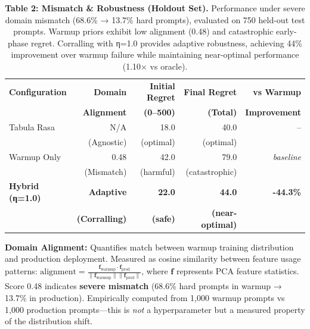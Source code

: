 
\begin{table}[t]
\caption{\textbf{Table 2: Mismatch \& Robustness (Holdout Set).} Performance under severe domain mismatch (68.6\% → 13.7\% hard prompts), evaluated on 750 held-out test prompts. Warmup priors exhibit low alignment (0.48) and catastrophic early-phase regret. Corralling with η=1.0 provides adaptive robustness, achieving 44\% improvement over warmup failure while maintaining near-optimal performance (1.10× vs oracle).}
\label{tab:mismatch-robustness}
\centering
\small
\begin{tabular}{@{}lrrrr@{}}
\toprule
\textbf{Configuration} & \textbf{Domain} & \textbf{Initial Regret} & \textbf{Final Regret} & \textbf{vs Warmup} \\
 & \textbf{Alignment} & \textbf{(0--500)} & \textbf{(Total)} & \textbf{Improvement} \\
\midrule
Tabula Rasa & N/A & 18.0 & 40.0 & -- \\
 & (Agnostic) & (optimal) & (optimal) & \\
\midrule
Warmup Only & 0.48 & 42.0 & 79.0 & \textit{baseline} \\
 & (Mismatch) & (harmful) & (catastrophic) & \\
\midrule
\textbf{Hybrid (η=1.0)} & \textbf{Adaptive} & \textbf{22.0} & \textbf{44.0} & \textbf{-44.3\%} \\
 & \textbf{(Corralling)} & \textbf{(safe)} & \textbf{(near-optimal)} & \\
\bottomrule
\end{tabular}
\vspace{0.5em}

\begin{tablenotes}
\small
\item \textbf{Domain Alignment:} Quantifies match between warmup training distribution and production deployment. Measured as cosine similarity between feature usage patterns: $\text{alignment} = \frac{\mathbf{f}_{\text{warmup}} \cdot \mathbf{f}_{\text{prod}}}{\|\mathbf{f}_{\text{warmup}}\| \|\mathbf{f}_{\text{prod}}\|}$, where $\mathbf{f}$ represents PCA feature statistics. Score 0.48 indicates \textbf{severe mismatch} (68.6\% hard prompts in warmup → 13.7\% in production). Empirically computed from 1,000 warmup prompts vs 1,000 production prompts—this is \emph{not} a hyperparameter but a measured property of the distribution shift.


\end{tablenotes}
\end{table}
